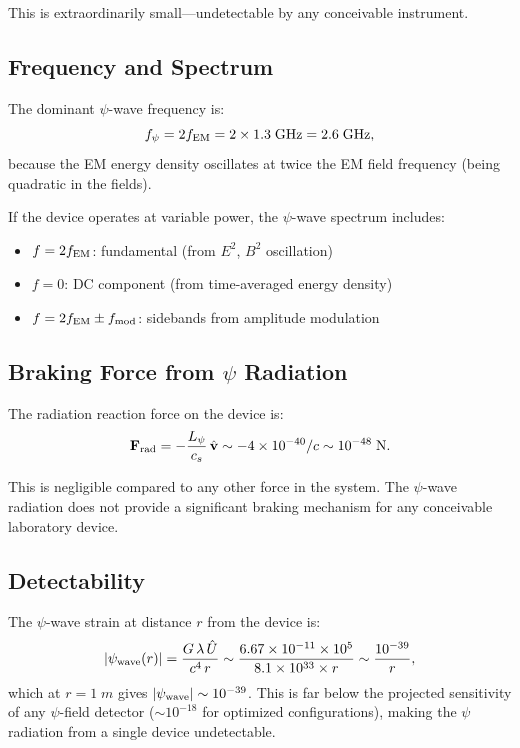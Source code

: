 \documentclass[aps,prd,twocolumn,superscriptaddress,floatfix,nofootinbib]{revtex4-2}
\newcommand{\lam}{\lambda}
\begin{document}
This is extraordinarily small---undetectable by any conceivable
instrument.

\subsection{Frequency and Spectrum}

The dominant $\psi$-wave frequency is:
\begin{equation}
f_\psi = 2f_{\rm EM} = 2 \times 1.3\;\si{GHz} = 2.6\;\si{GHz},
\label{eq:f-psi}
\end{equation}
because the EM energy density oscillates at twice the EM field frequency
(being quadratic in the fields).

If the device operates at variable power, the $\psi$-wave spectrum
includes:
\begin{itemize}[nosep]
\item $f = 2f_{\rm EM}$: fundamental (from $E^2$, $B^2$ oscillation)
\item $f = 0$: DC component (from time-averaged energy density)
\item $f = 2f_{\rm EM} \pm f_{\rm mod}$: sidebands from amplitude
modulation
\end{itemize}

\subsection{Braking Force from $\psi$ Radiation}

The radiation reaction force on the device is:
\begin{equation}
\mathbf{F}_{\rm rad} = -\frac{L_\psi}{c_s}\,\hat{\mathbf{v}}
\sim -4\times10^{-40}/c \sim 10^{-48}\;\si{N}.
\label{eq:braking-force}
\end{equation}

This is negligible compared to any other force in the system. The
$\psi$-wave radiation does not provide a significant braking mechanism
for any conceivable laboratory device.

\subsection{Detectability}\label{sec:detectability}

The $\psi$-wave strain at distance $r$ from the device is:
\begin{equation}
|\psi_{\rm wave}(r)| = \frac{G\,\lam\,\hat{U}}{c^4\,r}
\sim \frac{6.67\times10^{-11} \times 10^5}
{8.1\times10^{33} \times r}
\sim \frac{10^{-39}}{r},
\label{eq:psi-strain}
\end{equation}
which at $r = 1\;\si{m}$ gives $|\psi_{\rm wave}| \sim 10^{-39}$.
This is far below the projected sensitivity of any $\psi$-field
detector ($\sim 10^{-18}$ for optimized configurations), making the
$\psi$ radiation from a single device undetectable.
\end{document}
